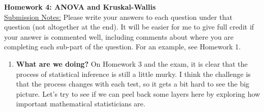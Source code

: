 \documentclass{article}\usepackage[]{graphicx}\usepackage[]{xcolor}
\begin{document}
\noindent\textbf{Homework 4: ANOVA and Kruskal-Wallis}\\
\noindent\makebox[\linewidth]{\rule{\textwidth}{0.4pt}}
\noindent\underline{Submission Notes:} Please write your answers to each 
question under that question (not altogether at the end). It will be easier for 
me to give full credit if your answer is commented well, including comments 
about where you are completing each sub-part of the question. For an example,
see Homework 1.\\
\noindent\makebox[\linewidth]{\rule{\textwidth}{0.4pt}}


\begin{enumerate}
\item \textbf{What are we doing?} On Homework 3 and the exam, it is clear that
the process of statistical inference is still a little murky. I think the 
challenge is that the process changes with each test, so it gets a bit hard
to see the big picture. Let's try to see if we can peel back some layers here
by exploring how important mathematical statisticians are.\\


\end{enumerate}
\end{document}
